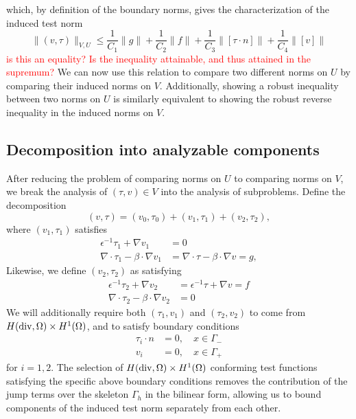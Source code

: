 \documentclass[11pt,onecolumn]{scrartcl}
\newcommand{\grad}{\nabla}
\renewcommand{\div}{\grad \cdot}
\begin{document}
which, by definition of the boundary norms, gives the characterization of the induced test norm 
\[
\|\left(v,\tau\right)\|_{V,U} \leq \frac{1}{C_1}\|g\| + \frac{1}{C_2}\|f\| + \frac{1}{C_3}\|[\tau\cdot n]\| + \frac{1}{C_4}\|[v]\|
\]
\textcolor{red}{is this an equality? Is the inequality attainable, and thus attained in the supremum?} We can now use this relation to compare two different norms on $U$ by comparing their induced norms on $V$.  Additionally, showing a robust inequality between two norms on $U$ is similarly equivalent to showing the robust reverse inequality in the induced norms on $V$.  

\subsection{Decomposition into analyzable components}
\label{sec:strategy2}

After reducing the problem of comparing norms on $U$ to comparing norms on $V$, we break the analysis of $\left(\tau,v\right) \in V$ into the analysis of subproblems.  Define the decomposition
\[
\left(v,\tau\right) = \left(v_0,\tau_0\right) + \left(v_1,\tau_1\right) + \left(v_2,\tau_2\right),
\]
where $\left(v_1,\tau_1\right)$ satisfies 
\begin{align*}
\epsilon^{-1}\tau_1 + \grad v_1 &= 0\\
\div \tau_1 - \beta\cdot \grad v_1 &=  \div \tau - \beta\cdot \grad v = g,
\end{align*} 
Likewise, we define $\left(v_2,\tau_2\right)$ as satisfying
\begin{align*}
\epsilon^{-1}\tau_2 + \grad v_2 &= \epsilon^{-1}\tau + \grad v = f\\
\div \tau_2 - \beta\cdot \grad v_2 &= 0
\end{align*}
We will additionally require both $\left(\tau_1,v_1\right)$ and $\left(\tau_2,v_2\right)$ to come from $H({\rm div}, \Omega)\times H^1(\Omega)$, and to satisfy boundary conditions
\begin{align}
\tau_i\cdot n &= 0, \quad x \in \Gamma_- \label{bc_1}\\
v_i &= 0, \quad x \in \Gamma_+ \label{bc_2}
\end{align}
for $i = 1, 2$.  The selection of $H({\rm div}, \Omega)\times H^1(\Omega)$ conforming test functions satisfying the specific above boundary conditions removes the contribution of the jump terms over the skeleton $\Gamma_h$ in the bilinear form, allowing us to bound components of the induced test norm separately from each other.   
\end{document}
